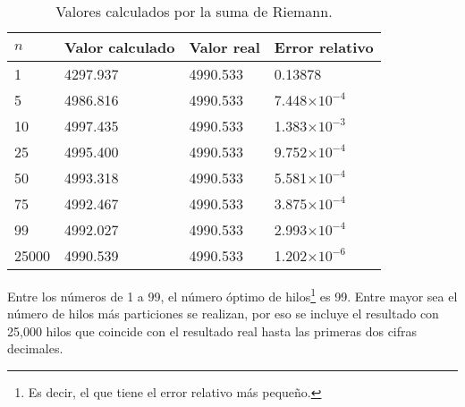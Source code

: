 \documentclass{article}
\begin{document}
\begin{table}[htb]
\begin{center}
\begin{tabular}{|l|l|l|l|}
\hline
$n$ & Valor calculado & Valor real & Error relativo \\ \hline \hline
 1 & 4297.937 & 4990.533 & 0.13878 \\ \hline
 5 & 4986.816 & 4990.533 & 7.448$\times 10^{-4}$ \\ \hline
 10 & 4997.435 & 4990.533 & 1.383$\times 10^{-3}$ \\ \hline
 25 & 4995.400 & 4990.533 & 9.752$\times 10^{-4}$ \\ \hline
 50 & 4993.318 & 4990.533 & 5.581$\times 10^{-4}$ \\ \hline
 75 & 4992.467 & 4990.533 & 3.875$\times 10^{-4}$ \\ \hline
 99 & 4992.027 & 4990.533 & 2.993$\times 10^{-4}$ \\ \hline
 25000 & 4990.539 & 4990.533 & 1.202$\times 10^{-6}$ \\ \hline
\end{tabular}
\caption{Valores calculados por la suma de Riemann.}
\end{center}
\label{table:1}
\end{table}

Entre los números de 1 a 99, el número óptimo de hilos\footnote{Es decir, el que tiene el error relativo más pequeño.} es 99. Entre mayor sea el número de hilos más particiones se realizan, por eso se incluye el resultado con 25,000 hilos que coincide con el resultado real hasta las primeras dos cifras decimales.
\end{document}
